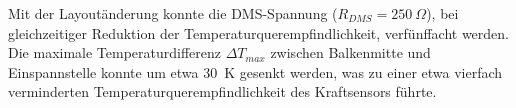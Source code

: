 Mit der Layoutänderung konnte die DMS-Spannung ($R_{DMS}=250~\Omega$),
bei gleichzeitiger Reduktion der Temperaturquerempfindlichkeit,
verfünffacht werden.
Die maximale Temperaturdifferenz $\Delta T_{max}$ zwischen Balkenmitte
und Einspannstelle konnte um etwa 30~K gesenkt werden, was zu einer
etwa vierfach verminderten Temperaturquerempfindlichkeit des Kraftsensors
führte.

